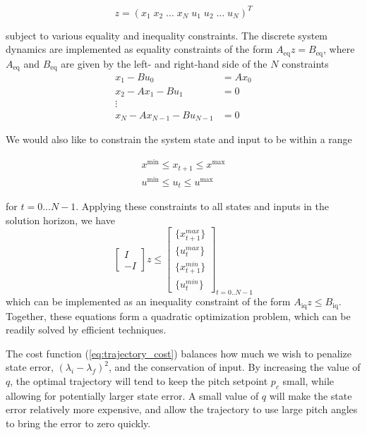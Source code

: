 \begin{equation}
    z = (x_1 \; x_2 \; ... \; x_N \; u_1 \; u_2 \; ... \; u_N)^T
\end{equation}

subject to various equality and inequality constraints. The discrete system dynamics are implemented as equality constraints of the form $A_{\text{eq}}z = B_{\text{eq}}$, where $A_{\text{eq}}$ and $B_{\text{eq}}$ are given by the left- and right-hand side of the $N$ constraints
\begin{align*}
    x_1 - Bu_0        &= Ax_0 \\
    x_2 - Ax_1 - Bu_1 &= 0    \\
    \vdots                    \\
    x_N - Ax_{N-1} - Bu_{N-1} &= 0
\end{align*}

We would also like to constrain the system state and input to be within a range

\begin{align}
    x^{\text{min}} \leq x_{t+1} \leq x^{\text{max}} \\
    u^{\text{min}} \leq u_t \leq u^{\text{max}}
\end{align}

for $t = 0...N-1$. Applying these constraints to all states and inputs in the solution horizon, we have
\begin{equation}
    \begin{bmatrix} I \\ -I \end{bmatrix} z
    \leq
    \begin{bmatrix}
    \{x_{t+1}^{max}\} \\
    \{u_t^{max}\} \\
    \{x_{t+1}^{min}\} \\
    \{u_t^{min}\}
    \end{bmatrix}_{t=0..N-1}
\end{equation}
which can be implemented as an inequality constraint of the form $A_{\text{iq}} z \leq B_{\text{iq}}$. Together, these equations form a quadratic optimization problem, which can be readily solved by efficient techniques.

The cost function (\ref{eq:trajectory_cost}) balances how much we wish to penalize state error, $(\lambda_i - \lambda_f)^2$, and the conservation of input. By increasing the value of $q$, the optimal trajectory will tend to keep the pitch setpoint $p_c$ small, while allowing for potentially larger state error. A small value of $q$ will make the state error relatively more expensive, and allow the trajectory to use large pitch angles to bring the error to zero quickly.

